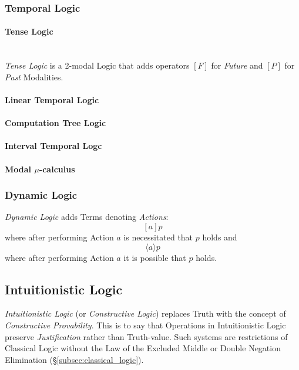 \documentclass{article}
\begin{document}
\subsubsection{Temporal Logic}

\paragraph{Tense Logic} \hfill \\

\emph{Tense Logic} is a 2-modal Logic that adds operators $[F]$ for
\emph{Future} and $[P]$ for \emph{Past} Modalities.

\paragraph{Linear Temporal Logic}

\paragraph{Computation Tree Logic}

\paragraph{Interval Temporal Logc}

\paragraph{Modal $\mu$-calculus}

\subsubsection{Dynamic Logic}

\emph{Dynamic Logic} adds Terms denoting \emph{Actions}:
\[[a]p\]
where after performing Action $a$ is necessitated that $p$ holds and
\[\langle a \rangle p\]
where after performing Action $a$ it is possible that $p$ holds.

\subsection{Intuitionistic Logic}\label{subsec:intuitionistic_logic}

\emph{Intuitionistic Logic} (or \emph{Constructive Logic}) replaces
Truth with the concept of \emph{Constructive Provability}. This is to
say that Operations in Intuitionistic Logic preserve
\emph{Justification} rather than Truth-value. Such systems are
restrictions of Classical Logic without the Law of the Excluded Middle
or Double Negation Elimination (\S\ref{subsec:classical_logic}).
\end{document}
